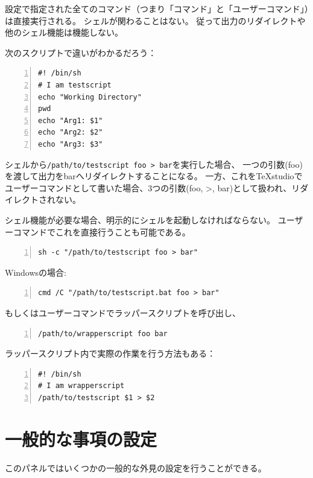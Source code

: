 設定で指定された全てのコマンド（つまり「コマンド」と「ユーザーコマンド」）は直接実行される。
シェルが関わることはない。
従って出力のリダイレクトや他のシェル機能は機能しない。

次のスクリプトで違いがわかるだろう：

\begin{lstlisting}[frame=single,breaklines=true,numbers=left]
#! /bin/sh
# I am testscript
echo "Working Directory"
pwd
echo "Arg1: $1"
echo "Arg2: $2"
echo "Arg3: $3"
\end{lstlisting}

シェルから\verb+/path/to/testscript foo > bar+を実行した場合、
一つの引数(foo)を渡して出力をbarへリダイレクトすることになる。
一方、これをTeXstudioでユーザーコマンドとして書いた場合、3つの引数(foo,
\textgreater{}, bar)として扱われ、リダイレクトされない。

シェル機能が必要な場合、明示的にシェルを起動しなければならない。
ユーザーコマンドでこれを直接行うことも可能である。

\begin{lstlisting}[frame=single,breaklines=true,numbers=left]
sh -c "/path/to/testscript foo > bar"
\end{lstlisting}

Windowsの場合:

\begin{lstlisting}[frame=single,breaklines=true,numbers=left]
cmd /C "/path/to/testscript.bat foo > bar"
\end{lstlisting}

もしくはユーザーコマンドでラッパースクリプトを呼び出し、

\begin{lstlisting}[frame=single,breaklines=true,numbers=left]
/path/to/wrapperscript foo bar
\end{lstlisting}

ラッパースクリプト内で実際の作業を行う方法もある：

\begin{lstlisting}[frame=single,breaklines=true,numbers=left]
#! /bin/sh
# I am wrapperscript
/path/to/testscript $1 > $2
\end{lstlisting}

\section{一般的な事項の設定}

このパネルではいくつかの一般的な外見の設定を行うことができる。

